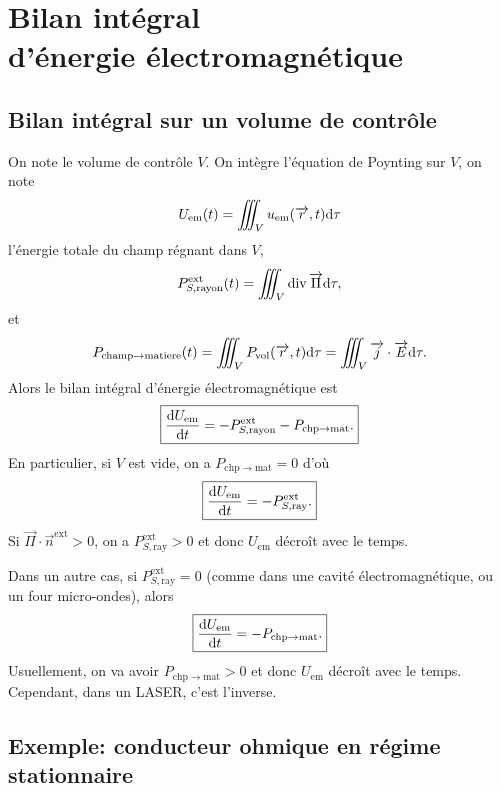 \section{Bilan intégral\texorpdfstring{\\}{ }d'énergie électromagnétique}
\subsection{Bilan intégral sur un volume de contrôle}

On note le volume de contrôle $V$. On intègre l'équation de Poynting sur $V$, on note 
\begin{equation*}
    U_{\mathrm{em}}(t)=\iiint_{V}u_{\mathrm{em}}(\protect\overrightarrow{{r}},t)\mathrm{d}\tau
\end{equation*}
l'énergie totale du champ régnant dans $V$,
\begin{equation*}
    P_{S,\mathrm{rayon}}^{\mathrm{ext}}(t)=\iiint_{V}\operatorname{div}\protect\overrightarrow{{\Pi}}\mathrm{d}\tau,
\end{equation*}
et
\begin{equation*}
    P_{\mathrm{champ}\to\mathrm{matiere}}(t)=\iiint_{V}P_{\mathrm{vol}}(\protect\overrightarrow{{r}},t)\mathrm{d}\tau=\iiint_{V}\protect\overrightarrow{{j}}\cdot\protect\overrightarrow{{E}}\mathrm{d}\tau.
\end{equation*}
Alors le bilan intégral d'énergie électromagnétique est
\begin{equation*}
    \boxed{
        \frac{\mathrm{d} U_{\mathrm{em}}}{\mathrm{d} t}=-P_{S,\mathrm{rayon}}^{\mathrm{ext}}-P_{\mathrm{chp}\to\mathrm{mat}}.
    }
\end{equation*}
En particulier, si $V$ est vide, on a $P_{\mathrm{chp}\to\mathrm{mat}}=0$ d'où 
\begin{equation*}
    \boxed{
        \frac{\mathrm{d} U_{\mathrm{em}}}{\mathrm{d} t}=-P_{S,\mathrm{ray}}^{\mathrm{ext}}.
    }
\end{equation*}
Si $\vec{\Pi}\cdot\vec{n}^{\mathrm{ext}}>0$, on a $P_{S,\mathrm{ray}}^{\mathrm{ext}}>0$ et donc $U_{\mathrm{em}}$ décroît avec le temps.

Dans un autre cas, si $P_{S,\mathrm{ray}}^{\mathrm{ext}}=0$ (comme dans une cavité électromagnétique, ou un four micro-ondes), alors 
\begin{equation*}
    \boxed{
        \frac{\mathrm{d} U_{\mathrm{em}}}{\mathrm{d} t}=-P_{\mathrm{chp}\to\mathrm{mat}}.
    }
\end{equation*}
Usuellement, on va avoir $P_{\mathrm{chp}\to\mathrm{mat}}>0$ et donc $U_{\mathrm{em}}$ décroît avec le temps. Cependant, dans un LASER, c'est l'inverse.

\subsection{Exemple: conducteur ohmique en régime stationnaire}

